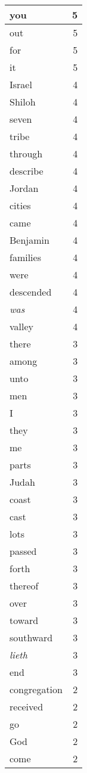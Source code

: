 \begin{center}
\begin{longtable}{l|r}
you & 5\\ \hline 
out & 5\\ \hline 
for & 5\\ \hline 
it & 5\\ \hline 
Israel & 4\\ \hline 
Shiloh & 4\\ \hline 
seven & 4\\ \hline 
tribe & 4\\ \hline 
through & 4\\ \hline 
describe & 4\\ \hline 
Jordan & 4\\ \hline 
cities & 4\\ \hline 
came & 4\\ \hline 
Benjamin & 4\\ \hline 
families & 4\\ \hline 
were & 4\\ \hline 
descended & 4\\ \hline 
\emph{was} & 4\\ \hline 
valley & 4\\ \hline 
there & 3\\ \hline 
among & 3\\ \hline 
unto & 3\\ \hline 
men & 3\\ \hline 
I & 3\\ \hline 
they & 3\\ \hline 
me & 3\\ \hline 
parts & 3\\ \hline 
Judah & 3\\ \hline 
coast & 3\\ \hline 
cast & 3\\ \hline 
lots & 3\\ \hline 
passed & 3\\ \hline 
forth & 3\\ \hline 
thereof & 3\\ \hline 
over & 3\\ \hline 
toward & 3\\ \hline 
southward & 3\\ \hline 
\emph{lieth} & 3\\ \hline 
end & 3\\ \hline 
congregation & 2\\ \hline 
received & 2\\ \hline 
go & 2\\ \hline 
God & 2\\ \hline 
come & 2\\ \hline 

\end{longtable}
\end{center}
